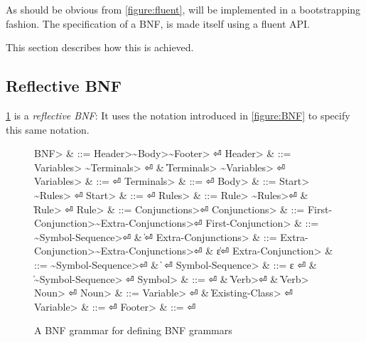As should be obvious from \cref{figure:fluent}, \Self will be implemented
  in a bootstrapping fashion.
The specification of a BNF, is made itself using a fluent API.

This section describes how this is achieved.

\subsection{Reflective BNF}
\cref{figure:BNF:BNF} is a \emph{reflective BNF}:
It uses the notation introduced in \cref{figure:BNF}
  to specify this same notation.

\begin{figure}[H]
  \begin{Grammar}
    \begin{aligned}
      \<BNF>                     & ::= \<Header>\~\<Body>\~\<Footer> \hfill⏎
      \<Header>                  & ::= \<Variables> \~\<Terminals> \hfill⏎
      {}                         & \| \<Terminals> \~\<Variables> \hfill⏎
      \<Variables>               & ::= \hfill⏎
      \<Terminals>               & ::= \hfill⏎
      \<Body>                    & ::= \<Start> \~\<Rules> \hfill⏎
      \<Start>                   & ::=  \hfill⏎
      \<Rules>                   & ::= \<Rule> \~\<Rules>\hfill⏎
      {}                         & \| \<Rule> \hfill⏎
      \<Rule>                    & ::=  \<Conjunctions>\hfill⏎
      \<Conjunctions>            & ::= \<First-Conjunction>\~\<Extra-Conjunctions>\hfill⏎
      \<First-Conjunction>       & ::= \~\<Symbol-Sequence>\hfill⏎
      {}                         & \| \hfill⏎
      \<Extra-Conjunctions> & ::= \<Extra-Conjunction>\~\<Extra-Conjunctions>\hfill⏎
      {}                         & \| ε\hfill⏎
      \<Extra-Conjunction>  & ::= \~\<Symbol-Sequence>\hfill⏎
      {}                         & \|  \hfill⏎
      \<Symbol-Sequence>         & ::= ε \hfill⏎
      {}                         & \| \~\<Symbol-Sequence> \hfill⏎
      \<Symbol>                  & ::=  \hfill⏎
      {}                         & \| \<Verb>\hfill⏎
      {}                         & \| \<Verb> \cc{,} \<Noun> \hfill⏎
      \<Noun>                    & ::= \<Variable> \hfill⏎
      {}                         & \| \<Existing-Class> \hfill⏎
      \<Variable>                & ::=  \hfill⏎
      \<Footer>                  & ::= \hfill⏎
    \end{aligned}
  \end{Grammar}
  \caption{A BNF grammar for defining BNF grammars}
  \label{figure:BNF:BNF}
\end{figure}
\begin{comment}
Note that this specification can only be approximate;
the figure uses verbs as replacement to indentation,
and special symbols such as~$|$,~$::-$ and~$ε$.
\end{comment}

